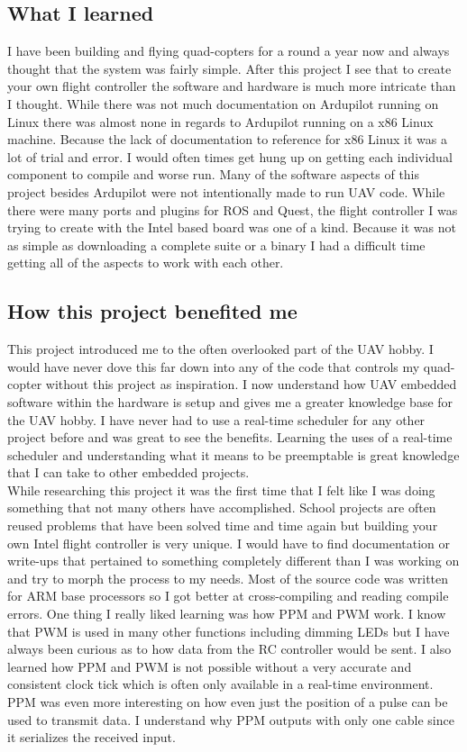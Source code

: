 \documentclass[letterpaper,10pt,notitlepage,fleqn]{article}
\begin{document}
\subsection{What I learned}
\indent I have been building and flying quad-copters for a round a year now and always thought that the system was fairly simple. After this project I see that to create your own flight controller the software and hardware is much more intricate than I thought. While there was not much documentation on Ardupilot running on Linux there was almost none in regards to Ardupilot running on a x86 Linux machine. Because the lack of documentation to reference for x86 Linux it was a
lot of trial and error. I would often times get hung up on getting each individual component to compile and worse run. Many of the software aspects of this project besides Ardupilot were not intentionally made to run UAV code. While there were many ports and plugins for ROS and Quest, the flight controller I was trying to create with the Intel based board was one of a kind. Because it was not as simple as downloading a complete suite or a binary I had a difficult time getting
all of the aspects to work with each other. 
\subsection{How this project benefited me}
\indent This project introduced me to the often overlooked part of the UAV hobby. I would have never dove this far down into any of the code that controls my quad-copter without this project as inspiration. I now understand how UAV embedded software within the hardware is setup and gives me a greater knowledge base for the UAV hobby. I have never had to use a real-time scheduler for any other project before and was great to see the benefits. Learning the uses of a real-time
scheduler and understanding what it means to be preemptable is great knowledge that I can take to other embedded projects. 
\\
\indent While researching this project it was the first time that I felt like I was doing something that not many others have accomplished. School projects are often reused problems that have been solved time and time again but building your own Intel flight controller is very unique. I would have to find documentation or write-ups that pertained to something completely different than I was working on and try to morph the process to my needs. Most of the source code was written for ARM base
processors so I got better at cross-compiling and reading compile errors. 
One thing I really liked learning was how PPM and PWM work. I know that PWM is used in many other functions including dimming LEDs but I have always been curious as to how data from the RC controller would be sent. I also learned how PPM and PWM is not possible without a very accurate and consistent clock tick which is often only available in a real-time environment. PPM was even more interesting on how even just the position of a pulse can be used to transmit data. I
understand why PPM outputs with only one cable since it serializes the received input.
\end{document}

